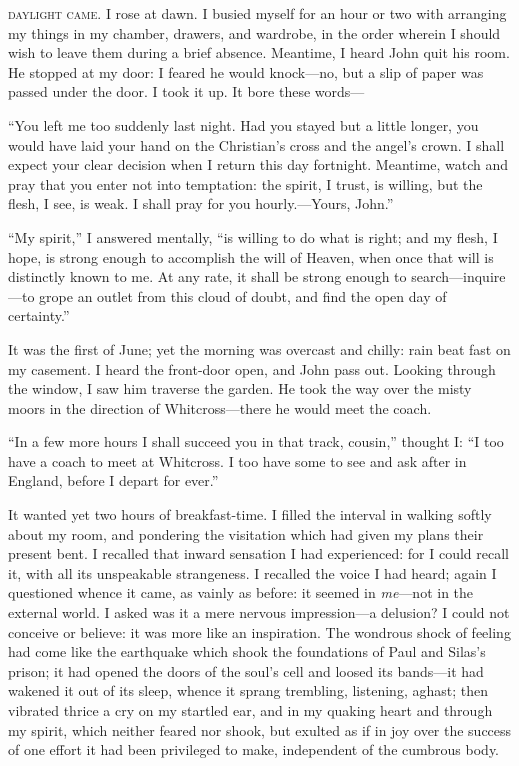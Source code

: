 
 \textsc{daylight came.} I rose at dawn. I busied myself for an hour or two
with arranging my things in my chamber, drawers, and wardrobe, in the
order wherein I should wish to leave them during a brief absence.
Meantime, I heard \St{} John quit his room. He stopped at my door: I
feared he would knock---no, but a slip of paper was passed under the
door. I took it up. It bore these words---

\enquote{You left me too suddenly last night. Had you stayed but a little
	longer, you would have laid your hand on the Christian's cross and the
	angel's crown. I shall expect your clear decision when I return this
	day fortnight. Meantime, watch and pray that you enter not into
	temptation: the spirit, I trust, is willing, but the flesh, I see, is
	weak. I shall pray for you hourly.---Yours, {\St{} John}.}

\enquote{My spirit,} I answered mentally, \enquote{is willing to do what
	is right; and my flesh, I hope, is strong enough to accomplish the will
	of Heaven, when once that will is distinctly known to me. At any rate,
	it shall be strong enough to search---inquire---to grope an outlet from
	this cloud of doubt, and find the open day of certainty.}

It was the first of June; yet the morning was overcast and chilly: rain
beat fast on my casement. I heard the front-door open, and \St{} John
pass out. Looking through the window, I saw him traverse the garden.
He took the way over the misty moors in the direction of
Whitcross---there he would meet the coach.

\enquote{In a few more hours I shall succeed you in that track, cousin,}
thought I: \enquote{I too have a coach to meet at Whitcross. I too have
	some to see and ask after in England, before I depart for ever.}

It wanted yet two hours of breakfast-time. I filled the interval in
walking softly about my room, and pondering the visitation which had
given my plans their present bent. I recalled that inward sensation I
had experienced: for I could recall it, with all its unspeakable
strangeness. I recalled the voice I had heard; again I questioned
whence it came, as vainly as before: it seemed in \emph{me}---not in the
external world. I asked was it a mere nervous impression---a delusion?
I could not conceive or believe: it was more like an inspiration. The
wondrous shock of feeling had come like the earthquake which shook the
foundations of Paul and Silas's prison; it had opened the doors of the
soul's cell and loosed its bands---it had wakened it out of its sleep,
whence it sprang trembling, listening, aghast; then vibrated thrice a
cry on my startled ear, and in my quaking heart and through my spirit,
which neither feared nor shook, but exulted as if in joy over the
success of one effort it had been privileged to make, independent of the
cumbrous body.

